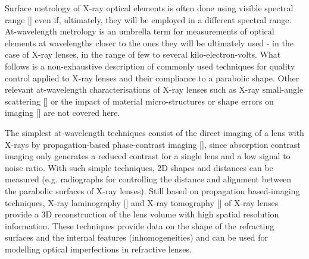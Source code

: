 \begin{refsection}
Surface metrology of X-ray optical elements is often done using visible spectral range [\cite{Alcock2016, Vivo2019}] even if, ultimately, they will be employed in a different spectral range. At-wavelength metrology is an umbrella term for measurements of optical elements at wavelengths closer to the ones they will be ultimately used - in the case of X-ray lenses, in the range of few to several kilo-electron-volts. What follows is a non-exhaustive description of commonly used techniques for quality control applied to X-ray lenses and their compliance to a parabolic shape. Other relevant at-wavelength characterisations of X-ray lenses such as X-ray small-angle scattering [\cite{Roth2014, Chubar2020}] or the impact of material micro-structures or shape errors on imaging [\cite{Chubar2020,Lyatun2020}] are not covered here. 

The simplest at-wavelength techniques consist of the direct imaging of a lens with X-rays by propagation-based phase-contrast imaging [\cite{Endrizzi2018}], since absorption contrast imaging only generates a reduced contrast for a single lens and a low signal to noise ratio. With such simple techniques, 2D shapes and distances can be measured (e.g. radiographs for controlling the distance and alignment between the parabolic surfaces of X-ray lenses). Still based on propagation based-imaging techniques, X-ray laminography [\cite{Helfen2011,Roth2014}] and X-ray tomography [\cite{Landis2010,Narikovich2017}] of X-ray lenses provide a 3D reconstruction of the lens volume with high spatial resolution information. These techniques provide data on the shape of the refracting surfaces and the internal features (inhomogeneities) and can be used for modelling optical imperfections in refractive lenses. 



\end{refsection}
